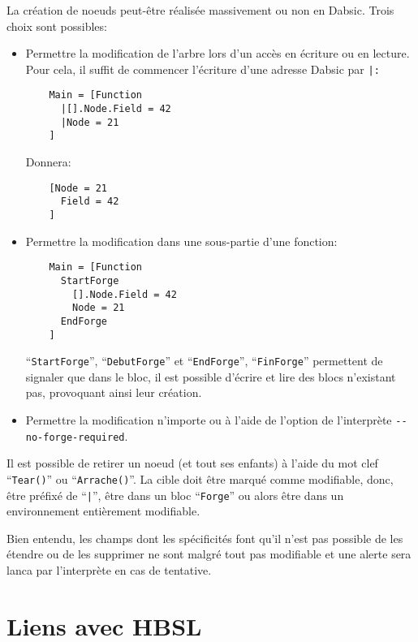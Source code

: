 \documentclass[a5paper, 12pt]{book}
\begin{document}
La création de noeuds peut-être réalisée massivement
ou non en Dabsic. Trois choix sont possibles:

\begin{itemize}
  \item Permettre la modification de l'arbre lors d'un accès
    en écriture ou en lecture. Pour cela, il suffit de commencer
    l'écriture d'une adresse Dabsic par \verb!|:!\\

    \begin{verbatim}
    Main = [Function
      |[].Node.Field = 42
      |Node = 21
    ]
    \end{verbatim}

    Donnera:\\
    \begin{verbatim}
    [Node = 21
      Field = 42
    ]
    \end{verbatim}
    
  \item Permettre la modification dans une sous-partie d'une
    fonction:\\

    \begin{verbatim}
    Main = [Function
      StartForge
        [].Node.Field = 42
        Node = 21
      EndForge
    ]
    \end{verbatim}

    ``\verb!StartForge!'', ``\verb!DebutForge!'' et ``\verb!EndForge!'', ``\verb!FinForge!''
    permettent de signaler que dans le bloc, il est possible
    d'écrire et lire des blocs n'existant pas, provoquant ainsi
    leur création.
    

  \item Permettre la modification n'importe ou à l'aide
    de l'option de l'interprète \verb!--no-forge-required!.
\end{itemize}

Il est possible de retirer un noeud (et tout ses enfants)
à l'aide du mot clef ``\verb!Tear()!'' ou ``\verb!Arrache()!''. La cible
doit être marqué comme modifiable, donc, être préfixé de ``\verb!|!'',
être dans un bloc ``\verb!Forge!'' ou alors être dans un environnement
entièrement modifiable.

Bien entendu, les champs dont les spécificités font
qu'il n'est pas possible de les étendre ou de les supprimer
ne sont malgré tout pas modifiable et une alerte sera
lanca par l'interprète en cas de tentative.

\chapter{Liens avec HBSL}
\end{document}
